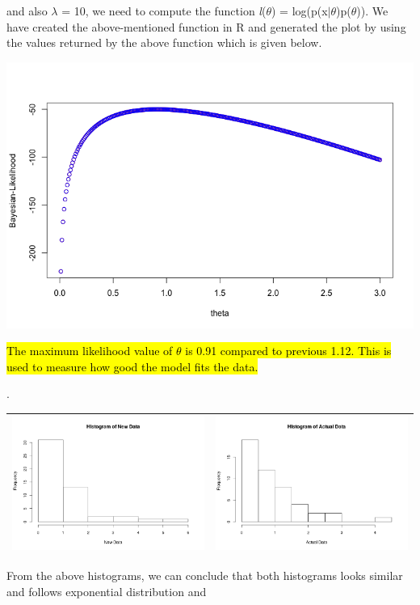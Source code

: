\documentclass[a4paper,10pt]{article}
\begin{document}
and also $\lambda$ = 10, we need to compute the function \textit{l}($\theta$) = log(p(x$|$$\theta$)p($\theta$)). 
We have created the above-mentioned function in R and generated the plot by using the values returned by the 
above function which is given below. \par
\begin{center}
	\includegraphics[width=.5\textwidth]{Bayesian.png}
\end{center}
\hl{The maximum likelihood value of $\theta$ is 0.91 compared to previous 1.12. This is used to measure how good the model fits the data.}
\par
{}. \begin{center}
	\begin{tabular}{|c|c|}
		\hline
		\includegraphics[width=.5\textwidth]{Hist_New_Data.png}&
		\includegraphics[width=.5\textwidth]{Hist_Actual_Data.png}\\
		\hline
	\end{tabular}\par
\end{center} \par
From the above histograms, we can conclude that both histograms looks similar and follows exponential distribution and
$$
\end{document}
